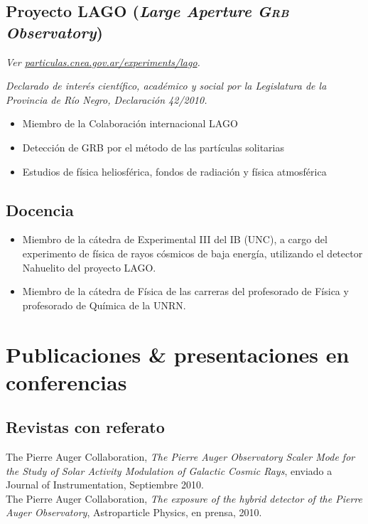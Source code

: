 \documentclass[11pt, a4paper]{article}
\newcommand{\years}[1]{\marginnote{\scriptsize #1}}
\begin{document}
\subsection*{Proyecto LAGO ({\emph{Large Aperture \textsc{Grb} Observatory}})}
\small\textit{Ver
\href{http://particulas.cnea.gov.ar/experiments/lago/}{particulas.cnea.gov.ar/experiments/lago}.
}

{\emph{Declarado de interés científico, académico y social por la Legislatura de la
Provincia de Río Negro, Declaración 42/2010.}}

\begin{itemize}
\item Miembro de la Colaboración internacional LAGO
\item Detección de GRB por el método de las partículas solitarias
\item Estudios de física heliosférica, fondos de radiación y física atmosférica
\end{itemize}

\subsection*{Docencia}

\begin{itemize}
\item Miembro de la cátedra de Experimental III del IB (UNC), a cargo del
experimento de física de rayos cósmicos de baja energía, utilizando el detector
Nahuelito del proyecto LAGO.
\item Miembro de la cátedra de Física de las carreras del profesorado de Física
y profesorado de Química de la UNRN.
\end{itemize}
 
\section*{Publicaciones \& presentaciones en conferencias}

\subsection*{Revistas con referato}
\noindent
\years{2010}The Pierre Auger Collaboration, {\emph{The Pierre Auger Observatory
Scaler Mode for the Study of Solar Activity Modulation of Galactic Cosmic
Rays}}, enviado a Journal of Instrumentation, Septiembre 2010.\\

\years{2010}The Pierre Auger Collaboration, {\emph{The exposure of the hybrid
detector of the Pierre Auger Observatory}}, Astroparticle Physics, en prensa,
2010.\\
\end{document}
